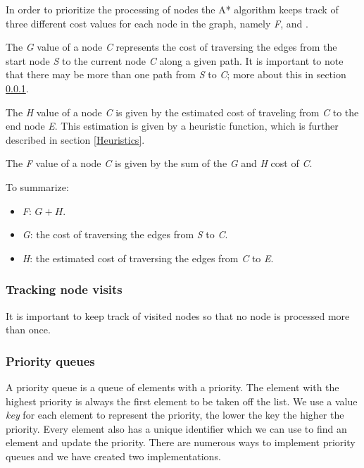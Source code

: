 \documentclass[12pt, a4paper]{article}
\begin{document}
In order to prioritize the processing of nodes the A* algorithm keeps track of
three different cost values for each node in the graph, namely \textit{F},
 and .

The \textit{G} value of a node \textit{C} represents the cost of traversing the
edges from the start node \textit{S} to the current node \textit{C} along a
given path. It is important to note that there may be more than one path from
\textit{S} to \textit{C}; more about this in section \ref{Tracking node visits}.

The \textit{H} value of a node \textit{C} is given by the estimated cost of
traveling from \textit{C} to the end node \textit{E}. This estimation is given
by a heuristic function, which is further described in section \ref{Heuristics}.

The \textit{F} value of a node \textit{C} is given by the sum of the \textit{G}
and \textit{H} cost of \textit{C}.

To summarize:
\begin{itemize}
	\item \textit{F}: $ G + H $.
	\item \textit{G}: the cost of traversing the edges from \textit{S} to
	\textit{C}.
	\item \textit{H}: the estimated cost of traversing the edges from \textit{C}
	to \textit{E}.
\end{itemize}


\subsubsection{Tracking node visits}
\label{Tracking node visits}

It is important to keep track of visited nodes so that no node is processed more
than once.



\subsubsection{Priority queues}
\label{Priority queues}

A priority queue is a queue of elements with a priority. The element with the highest priority is always the first element to be taken off the list. We use a value \textit{key} for each element to represent the priority, the lower the key the higher the priority. Every element also has a unique identifier which we can use to find an element and update the priority.  There are numerous ways to implement priority queues and we have created two implementations.
\end{document}
